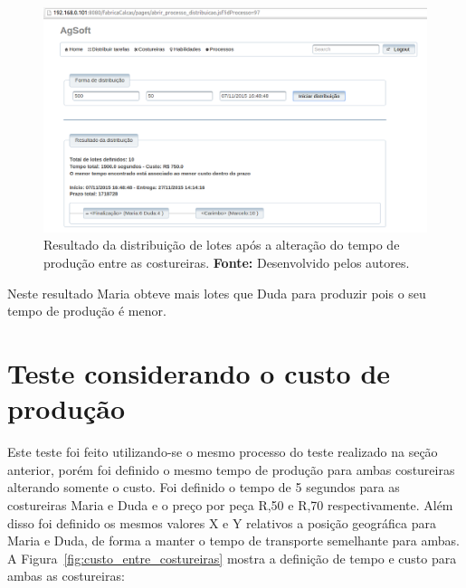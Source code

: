 \begin{figure}[h!]
	\centerline{\includegraphics[scale=0.3]{./imagens/novo_resultado_alterado_tempo_teste1.png}}
	\caption[Resultado da distribuição de lotes após a alteração do tempo de
	produção entre as costureiras.]
	{Resultado da distribuição de lotes após a alteração do tempo de
	produção entre as costureiras. \textbf{Fonte:} Desenvolvido pelos autores.}
	\label{fig:novo_resultado_distribuicao_teste1}
\end{figure}

\par Neste resultado Maria obteve mais lotes que Duda para produzir pois o seu tempo de produção é menor.

\section{Teste considerando o custo de produção}

\par Este teste foi feito utilizando-se o mesmo processo do teste realizado na seção anterior,
porém foi definido o mesmo tempo de produção para ambas costureiras alterando somente o custo. Foi definido 
o tempo de 5 segundos para as costureiras Maria e Duda e o preço por peça R,50 e R,70 respectivamente. Além disso foi definido os mesmos valores X e Y relativos a posição geográfica para 
Maria e Duda, de forma a manter o tempo de transporte semelhante para ambas. 
A Figura~\ref{fig:custo_entre_costureiras} mostra a definição de tempo e custo para ambas as costureiras:

\newpage

